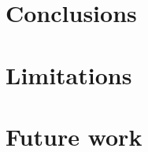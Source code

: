 

\section{Conclusions}
    \label{sec:conclusions}
    

\section{Limitations}
    \label{sec:limitations}
    

\section{Future work}
    \label{sec:future_work}
    
